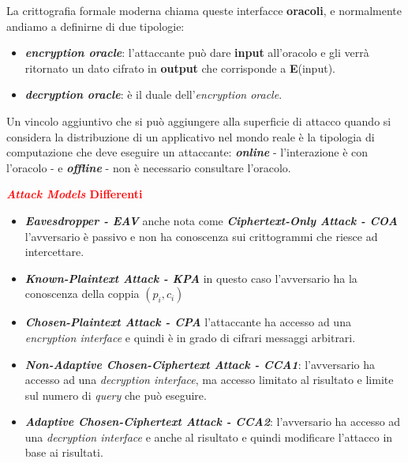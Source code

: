 \begin{flushleft}
    \smallskip

    La crittografia formale moderna chiama queste interfacce \textbf{oracoli}, e normalmente andiamo a definirne di due tipologie:
    \begin{itemize}[nosep]
        \item \textbf{\textit{encryption oracle}}: l'attaccante può dare \textbf{input} all'oracolo e gli verrà ritornato un dato cifrato in \textbf{output} che corrisponde a \textbf{E}(input).
        \item \textbf{\textit{decryption oracle}}: è il duale dell'\textit{encryption oracle}.
    \end{itemize}
    Un vincolo aggiuntivo che si può aggiungere alla superficie di attacco quando si considera la distribuzione di un applicativo nel mondo reale è la tipologia di computazione che deve eseguire un attaccante: \textbf{\textit{online}} - l'interazione è con l'oracolo - e \textbf{\textit{offline}} - non è necessario consultare l'oracolo.

    \smallskip

    \textcolor{red}{\textbf{\textit{Attack Models} Differenti}}
    \begin{center}
        \begin{minipage}[c]{0.75\textwidth}
            \begin{itemize}[nosep]
                \item \textbf{\textit{Eavesdropper - EAV}} anche nota come \textbf{\textit{Ciphertext-Only Attack - COA}} l'avversario è passivo e non ha conoscenza sui crittogrammi che riesce ad intercettare.
                \item \textbf{\textit{Known-Plaintext Attack - KPA}} in questo caso l'avversario ha la conoscenza della coppia $(p_i, c_i)$
                \item \textbf{\textit{Chosen-Plaintext Attack - CPA}} 
                l'attaccante ha accesso ad una \textit{encryption interface} e quindi è in grado di cifrari messaggi arbitrari.
                \item \textbf{\textit{Non-Adaptive Chosen-Ciphertext Attack - CCA1}}: l'avversario ha accesso ad una \textit{decryption interface}, ma accesso limitato al risultato e limite sul numero di \textit{query} che può eseguire.
                \item \textbf{\textit{Adaptive Chosen-Ciphertext Attack - CCA2}}: l'avversario ha accesso ad una \textit{decryption interface} e anche al risultato e quindi modificare l'attacco in base ai risultati.
            \end{itemize}
        \end{minipage}
        \hfill
        \begin{minipage}[c]{0.1\textwidth}
            \centering
        \end{minipage}
    \end{center}


\end{flushleft}
